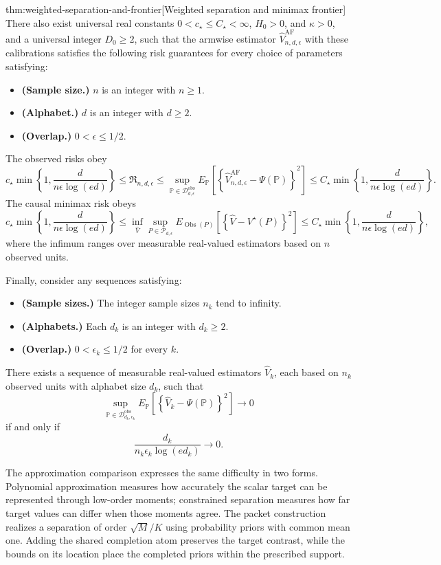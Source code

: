 \begin{theoremv}{thm:weighted-separation-and-frontier}[Weighted separation and minimax frontier]
There also exist universal real constants
\(0<c_\star\leq C_\star<\infty\), \(H_0>0\), and \(\kappa>0\), and a universal integer \(D_0\geq2\), such that the armwise estimator
\(\widehat V_{n,d,\epsilon}^{\mathrm{AF}}\) with these calibrations satisfies the following risk guarantees for every choice of parameters satisfying:
\begin{itemize}
\item \textbf{(Sample size.)} \(n\) is an integer with \(n\geq1\).
\item \textbf{(Alphabet.)} \(d\) is an integer with \(d\geq2\).
\item \textbf{(Overlap.)} \(0<\epsilon\leq1/2\).
\end{itemize}
The observed risks obey
\[
c_\star\min\left\{1,\frac{d}{n\epsilon\log(ed)}\right\}
\leq \mathfrak R_{n,d,\epsilon}
\leq
\sup_{\mathbb P\in\mathcal D_{d,\epsilon}^{\mathrm{obs}}}
E_{\mathbb P}\!\left[
\left\{\widehat V_{n,d,\epsilon}^{\mathrm{AF}}
-\Psi(\mathbb P)\right\}^2
\right]
\leq
C_\star\min\left\{1,\frac{d}{n\epsilon\log(ed)}\right\}.
\]
The causal minimax risk obeys
\[
c_\star\min\left\{1,\frac{d}{n\epsilon\log(ed)}\right\}
\leq
\inf_{\widehat V}
\sup_{P\in\mathcal P_{d,\epsilon}}
E_{\operatorname{Obs}(P)}\!\left[
\left\{\widehat V-V^\star(P)\right\}^2
\right]
\leq
C_\star\min\left\{1,\frac{d}{n\epsilon\log(ed)}\right\},
\]
where the infimum ranges over measurable real-valued estimators based on \(n\) observed units.

Finally, consider any sequences satisfying:
\begin{itemize}
\item \textbf{(Sample sizes.)} The integer sample sizes \(n_k\) tend to infinity.
\item \textbf{(Alphabets.)} Each \(d_k\) is an integer with \(d_k\geq2\).
\item \textbf{(Overlap.)} \(0<\epsilon_k\leq1/2\) for every \(k\).
\end{itemize}
There exists a sequence of measurable real-valued estimators
\(\widehat V_k\), each based on \(n_k\) observed units with alphabet size \(d_k\), such that
\[
\sup_{\mathbb P\in\mathcal D_{d_k,\epsilon_k}^{\mathrm{obs}}}
E_{\mathbb P}\!\left[
\left\{\widehat V_k-\Psi(\mathbb P)\right\}^2
\right]\longrightarrow0
\]
if and only if
\[
\frac{d_k}{n_k\epsilon_k\log(ed_k)}\longrightarrow0.
\]
\end{theoremv}

The approximation comparison expresses the same difficulty in two forms. Polynomial approximation measures how accurately the scalar target can be represented through low-order moments; constrained separation measures how far target values can differ when those moments agree. The packet construction realizes a separation of order \(\sqrt M/K\) using probability priors with common mean one. Adding the shared completion atom preserves the target contrast, while the bounds on its location place the completed priors within the prescribed support.

